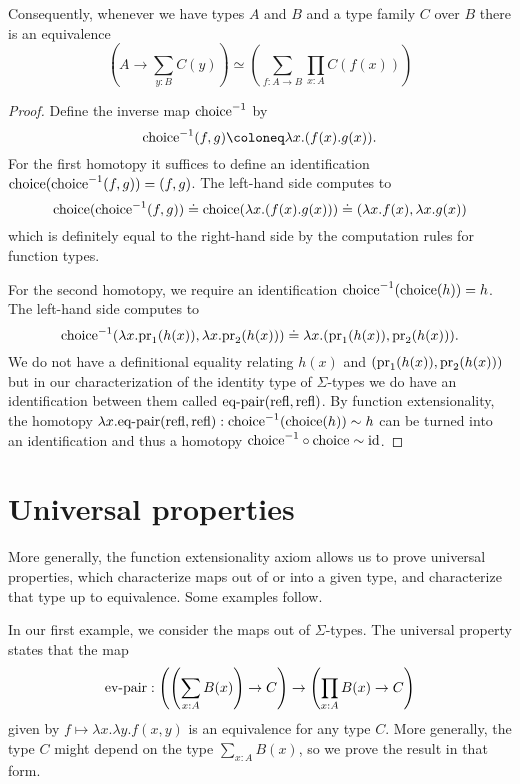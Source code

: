 \documentclass{amsart}
\theoremstyle{theorem}
\theoremstyle{definition}
\theoremstyle{remark}
\newcommand{\0}{\mathbbe{0}}
\newcommand{\1}{\mathbbe{1}}
\newcommand{\2}{\mathbbe{2}}
\newcommand{\3}{\mathbbe{3}}
\newcommand{\4}{\mathbbe{4}}
\newcommand{\term}[1]{{\textup{#1}}}
\newcommand{\id}{\term{id}}
\newcommand{\pr}{\term{pr}}
\newcommand{\refl}{\term{refl}}
\begin{document}
Consequently, whenever we have types $A$ and $B$ and a type family $C$ over $B$ there is an equivalence
\[ \left( A \to \sum_{y:B}C(y) \right) \simeq \left( \sum_{f:A \to B} \prod_{x:A} C(f(x))\right)\]

\begin{proof}
Define the inverse map $\term{choice}^{-1}$ by
\[ \term{choice}^{-1}(f,g) \coloneq \lambda x.(f(x).g(x)).\]
For the first homotopy it suffices to define an identification $\term{choice}(\term{choice}^{-1}(f,g)) = (f,g)$. The left-hand side computes to
\[ \term{choice}(\term{choice}^{-1}(f,g))  \doteq \term{choice}(\lambda x.(f(x).g(x))) \doteq (\lambda x.f(x),\lambda x.g(x))\]
which is definitely equal to the right-hand side by the computation rules for function types.

For the second homotopy, we require an identification $\term{choice}^{-1}(\term{choice}(h)) = h$. The left-hand side computes to
\[ \term{choice}^{-1} (\lambda x. \pr_1(h(x)), \lambda x.\pr_2(h(x))) \doteq \lambda x.(\pr_1(h(x)), \pr_2(h(x))).\]
We do not have a definitional equality relating $h(x)$ and $(\pr_1(h(x)), \pr_2(h(x)))$ but in our characterization of the identity type of $\Sigma$-types we do have an identification between them called $\term{eq-pair}(\refl,\refl)$. By function extensionality, the homotopy $\lambda x. \term{eq-pair}(\refl,\refl) : \term{choice}^{-1}(\term{choice}(h))\sim h$ can be turned into an identification and thus a homotopy $\term{choice}^{-1} \circ \term{choice} \sim \id$.
\end{proof}

\section*{Universal properties}

More generally, the function extensionality axiom allows us to prove universal properties, which characterize maps out of or into a given type, and characterize that type up to equivalence. Some examples follow.

In our first example, we consider the maps out of $\Sigma$-types. The universal property states that the map
\[ \term{ev-pair} : \left( \left( \sum_{x:A}B(x)\right) \to C \right) \to \left( \prod_{x:A}B(x) \to C \right)\]
given by $f \mapsto \lambda x.\lambda y. f(x,y)$ is an equivalence for any type $C$. More generally, the type $C$ might depend on the type $\sum_{x:A}B(x)$, so we prove the result in that form.
\end{document}

